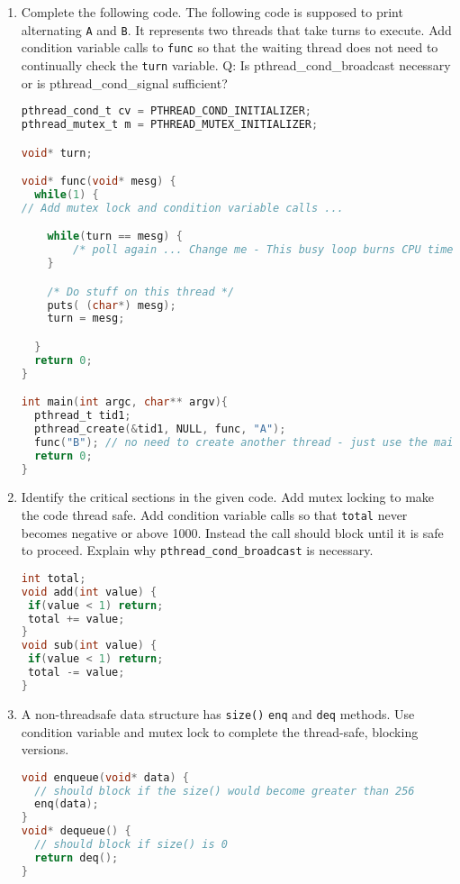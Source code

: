 \begin{enumerate}
\item Complete the following code. The following code is supposed to print alternating \texttt{A} and \texttt{B}. It represents two threads that take turns to execute. Add condition variable calls to \texttt{func} so that the waiting thread does not need to continually check the \texttt{turn} variable. Q: Is pthread\_cond\_broadcast necessary or is pthread\_cond\_signal sufficient?

\begin{lstlisting}[language=C]
pthread_cond_t cv = PTHREAD_COND_INITIALIZER;
pthread_mutex_t m = PTHREAD_MUTEX_INITIALIZER;

void* turn;

void* func(void* mesg) {
  while(1) {
// Add mutex lock and condition variable calls ...

    while(turn == mesg) {
        /* poll again ... Change me - This busy loop burns CPU time! */
    }

    /* Do stuff on this thread */
    puts( (char*) mesg);
    turn = mesg;

  }
  return 0;
}

int main(int argc, char** argv){
  pthread_t tid1;
  pthread_create(&tid1, NULL, func, "A");
  func("B"); // no need to create another thread - just use the main thread
  return 0;
}
\end{lstlisting}

\item Identify the critical sections in the given code. Add mutex locking to make the code thread safe. Add condition variable calls so that \texttt{total} never becomes negative or above 1000. Instead the call should block until it is safe to proceed. Explain why \texttt{pthread\_cond\_broadcast} is necessary.

\begin{lstlisting}[language=C]
int total;
void add(int value) {
 if(value < 1) return;
 total += value;
}
void sub(int value) {
 if(value < 1) return;
 total -= value;
}
\end{lstlisting}

\item A non-threadsafe data structure has \texttt{size()} \texttt{enq} and \texttt{deq} methods. Use condition variable and mutex lock to complete the thread-safe, blocking versions.

\begin{lstlisting}[language=C]
void enqueue(void* data) {
  // should block if the size() would become greater than 256
  enq(data);
}
void* dequeue() {
  // should block if size() is 0
  return deq();
}
\end{lstlisting}


\end{enumerate}

